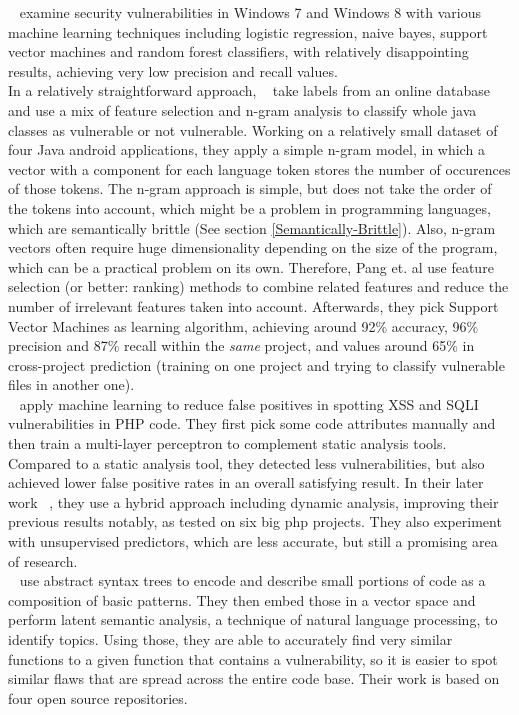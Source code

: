 \documentclass[
	a4paper,
	pagesize,
	pdftex,
	12pt,
	twoside, %
	BCOR=5mm, %
	ngerman,
	fleqn,
	final,
	]{scrartcl}
\begin{document}
~\cite{Morrison.2015} examine security vulnerabilities in Windows 7 and Windows 8 with various machine learning techniques including logistic regression, naive bayes, support vector machines and random forest classifiers, with relatively disappointing results, achieving very low precision and recall values.\\
In a relatively straightforward approach, ~\cite{Pang.2015} take labels from an online database and use a mix of feature selection and n-gram analysis to classify whole java classes as vulnerable or not vulnerable. Working on a relatively small dataset of four Java android applications, they apply a simple n-gram model, in which a vector with a component for each language token stores the number of occurences of those tokens. The n-gram approach is simple, but does not take the order of the tokens into account, which might be a problem in programming languages, which are semantically brittle (See section \ref{Semantically-Brittle}). Also, n-gram vectors often require huge dimensionality depending on the size of the program, which can be a practical problem on its own. Therefore, Pang et. al use feature selection (or better: ranking) methods to combine related features and reduce the number of irrelevant features taken into account. Afterwards, they pick Support Vector Machines as learning algorithm, achieving around 92\% accuracy, 96\% precision and 87\% recall within the \textit{same} project, and values around 65\% in cross-project prediction (training on one project and trying to classify vulnerable files in another one). \\
~\cite{Shar.2013b} apply machine learning to reduce false positives in spotting XSS and SQLI vulnerabilities in PHP code. They first pick some code attributes manually and then train a multi-layer perceptron to complement static analysis tools. Compared to a static analysis tool, they detected less vulnerabilities, but also achieved lower false positive rates in an overall satisfying result. In their later work ~\cite{Shar.2013}, they use a hybrid approach including dynamic analysis, improving their previous results notably, as tested on six big php projects. They also experiment with unsupervised predictors, which are less accurate, but still a promising area of research. \\
~\cite{Yamaguchi.2012} use abstract syntax trees to encode and describe small portions of code as a composition of basic patterns. They then embed those in a vector space and perform latent semantic analysis, a technique of natural language processing, to identify topics. Using those, they are able to accurately find very similar functions to a given function that contains a vulnerability, so it is easier to spot similar flaws that are spread across the entire code base. Their work is based on four open source repositories.\\
\end{document}
